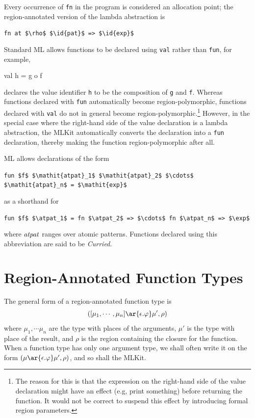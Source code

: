 \documentclass[12pt]{book}
\begin{document}
Every occurrence of \lstinline{fn}
%
%
in the program is considered an allocation point; the region-annotated version
of the lambda abstraction is
\begin{center}
  \lstinline!fn at $\rho$ $\id{pat}$ => $\id{exp}$!
\end{center}
Standard ML allows functions to be declared using \lstinline{val} rather than
\lstinline{fun}, for example,
\begin{smlcode}
  val h = g o f
\end{smlcode}
declares the value identifier \lstinline{h} to be the composition of \lstinline{g}
and \lstinline{f}.  Whereas functions declared with
%
%
\lstinline{fun} automatically become region-polymorphic, functions
declared with
%
%
\lstinline{val} do not in general become
%
%
region-polymorphic.\footnote{The reason for this is that the expression on the
right-hand side of the value declaration might have an effect (e.g, print
something) before returning the function.  It would not be correct to suspend
this effect by introducing formal region parameters.} However, in the special
case where the right-hand side of the value declaration is a
%
%
lambda abstraction, the MLKit automatically converts the declaration into a
\lstinline{fun} declaration, thereby making the function region-polymorphic
after all.

ML allows declarations of the form
%
%
%
\begin{center}
  \lstinline!fun $f$ $\mathit{atpat}_1$ $\mathit{atpat}_2$ $\cdots$ $\mathit{atpat}_n$ = $\mathit{exp}$!
\end{center}
as a shorthand for
\begin{center}
  \lstinline!fun $f$ $\atpat_1$ = fn $\atpat_2$ => $\cdots$ fn $\atpat_n$ => $\exp$!
\end{center}
where ${\it atpat}$ ranges over atomic patterns.  Functions declared using this
abbreviation are said to be
%
%
%
{\em Curried}.

\section{Region-Annotated Function Types}
%
\label{functiontypes.sec}%
%
The general form of a region-annotated
%
%
%
%
function type is
$$([\mu_1,\cdots,\mu_n] \ar{\epsilon.\rea} \mu', \rho)$$ where
$\mu_1,\cdots\mu_n$ are the type with places of the arguments, $\mu'$ is the
type with place of the result, and $\rho$ is the region containing the closure
for the function. When a function type has only one argument type, we shall
often write it on the form $(\mu \ar{\epsilon.\rea} \mu', \rho)$, and so shall
the MLKit.
\end{document}
